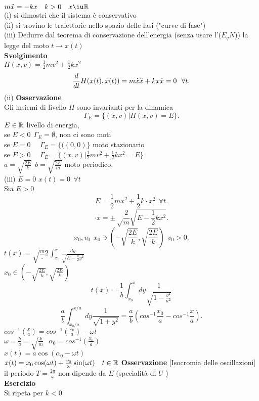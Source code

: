 \documentclass{article}
\begin{document}
$m \ddot x = -k x \ \ \ k > 0 \ \ \ x\iu \R$\\
(i) si dimostri che il sistema è conservativo\\
(ii) si trovino le traiettorie nello spazio delle fasi ("curve di fase")\\
(iii) Dedurre dal teorema di conservazione dell'energia (senza usare l'($E_qN$)) la legge del moto $t \rightarrow x(t)$\\
\textbf{Svolgimento}\\
$H(x,v) = \frac 12 mv^2 + \frac 12 k x^2$\\
 \[
	 \frac{d }{d t}H(x(t),\dot x(t)) = m\dot x\ddot x + kx\dot x = 0 \ \ \forall t
.\] 
(ii)
\textbf{Osservazione}\\
Gli insiemi di livello $H$ sono invarianti per la dinamica
\[
	\Gamma_E = \{(x,v) | H(x,v)=E\}
.\] 
$E\in\mathbb{R}$ livello di energia,\\
se $E< 0 \ \ \Gamma_E = \emptyset$, non ci sono moti\\
se  $E = 0$ \ \  $\Gamma_E = \{((0,0)\}$ moto stazionario\\
se $E > 0$ \ \  $\Gamma_E = \{(x,v) | \frac 12 mv^2 + \frac 12 kx^2 = E\}$ \\
$a = \sqrt{\frac{2E}k} \ \ b = \sqrt{\frac{2E}{m}}$ moto periodico.\\
(iii) $E = 0$  $x(t) = 0 \ \ \forall t$\\
Sia  $E > 0$
 \[
 E = \frac 12 m\dot x ^2 + \frac 12 k \cdot x^2 \ \ \forall t
.\] 
\[
	\cdot x = \pm\sqrt\frac 2m \sqrt{E-\frac 12kx^2}
.\] 
\[
	x_0,v_0 \ \ x_0\ni \left(-\sqrt{\frac{2E}{k}},\sqrt{\frac{2E}k} \right) \ \ v_0>0 
.\] 
$t(x) = \sqrt{\frac m_2}\int_{x_0}^x\frac{dy}{\sqrt{E-\frac k 2y^2}}$\\
$x_0\in \left(-\sqrt{\frac{2E}{k}},\sqrt{\frac{2E}k} \right)$
\[
t(x) = \frac 1b \int_{x_0}^x dy \frac{1}{\sqrt{1-\frac{y^2}{a^2}}}\]
\[
	\frac ab\int^{x/a}_{x_0/a}dy\frac{1}{\sqrt{1 + y^2}} = \frac ab (cos^{-1}\frac {x_0}a -cos^{-1}\frac xa)
.\] 
$cos^{-1}(\frac xa) = cos^{-1}(\frac {x_0}{a}) - \omega t$\\
$\omega = \frac ba = \sqrt{\frac km}\ \ \ \alpha_0 = cos^{-1}(\frac{ x_0}{a})$ \\
$x(t) = a\cos(\alpha_0 - \omega t)$\\
$x(t) = x_0\cos(\omega t) + \frac {v_0}\omega\sin(\omega t) \ \ \ t\in\mathbb{R}$
\textbf{Osservazione} [Isocromia delle oscillazioni]\\
il periodo $T = \frac {2\pi}\omega$ non dipende da $E$ (specialità di $U$ )\\
\textbf{Esercizio}\\
Si ripeta per $k < 0 $\\
\end{document}
